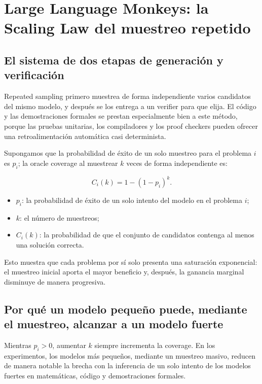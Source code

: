 \section{Large Language Monkeys: la Scaling Law del muestreo repetido}

\subsection{El sistema de dos etapas de generación y verificación}

Repeated sampling primero muestrea de forma independiente varios candidatos del mismo modelo, y después se los entrega a un verifier para que elija. El código y las demostraciones formales se prestan especialmente bien a este método, porque las pruebas unitarias, los compiladores y los proof checkers pueden ofrecer una retroalimentación automática casi determinista.


Supongamos que la probabilidad de éxito de un solo muestreo para el problema $i$ es $p_i$; la oracle coverage al muestrear $k$ veces de forma independiente es:

$$
C_i(k)=1-(1-p_i)^k.
$$

\begin{itemize}
    \item $p_i$: la probabilidad de éxito de un solo intento del modelo en el problema $i$;
    \item $k$: el número de muestreos;
    \item $C_i(k)$: la probabilidad de que el conjunto de candidatos contenga al menos una solución correcta.
\end{itemize}

Esto muestra que cada problema por sí solo presenta una saturación exponencial: el muestreo inicial aporta el mayor beneficio y, después, la ganancia marginal disminuye de manera progresiva.

\subsection{Por qué un modelo pequeño puede, mediante el muestreo, alcanzar a un modelo fuerte}

Mientras $p_i>0$, aumentar $k$ siempre incrementa la coverage. En los experimentos, los modelos más pequeños, mediante un muestreo masivo, reducen de manera notable la brecha con la inferencia de un solo intento de los modelos fuertes en matemáticas, código y demostraciones formales.

